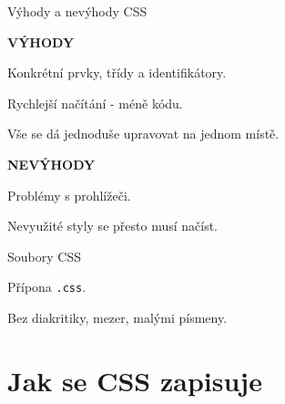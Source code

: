 \documentclass[aspectratio=169]{beamer}
\begin{document}
\begin{frame}{Výhody a nevýhody CSS}
    \begin{multicols}{2}
        \centering

        \begin{cardTiny}
            \begin{center}
                \textbf{VÝHODY}
            \end{center}

            \begin{flushleft}
            Konkrétní prvky, třídy a identifikátory.

            Rychlejší načítání - méně kódu.

            Vše se dá jednoduše upravovat na jednom místě.
            \end{flushleft}
        \end{cardTiny}

        \begin{cardTiny}
            \begin{center}
                \textbf{NEVÝHODY}
            \end{center}
        
            Problémy s prohlížeči.

            Nevyužité styly se přesto musí načíst.
        \end{cardTiny}
    \end{multicols}
\end{frame}

\begin{frame}{Soubory CSS}
    \begin{cardTiny}
        Přípona \texttt{.css}.

        Bez diakritiky, mezer, malými písmeny.
    \end{cardTiny}
\end{frame}



\section{Jak se CSS zapisuje}
\end{document}
